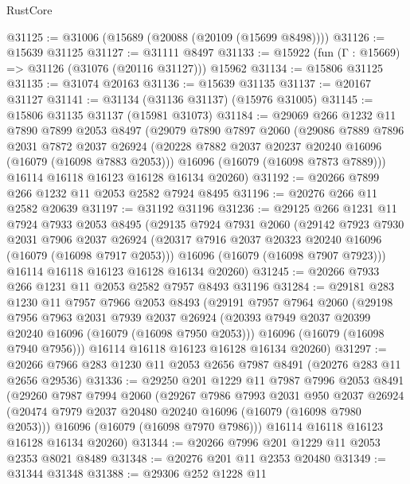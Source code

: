 \begin{lexlean}{RustCore}
\begin{coremodule}
@31125 := @31006 (@15689 (@20088 (@20109 (@15699 @8498))))
@31126 := @15639 @31125
@31127 := @31111 @8497
@31133 := @15922 (fun (Γ : @15669) => @31126 (@31076 (@20116 @31127))) @15962
@31134 := @15806 @31125
@31135 := @31074 @20163
@31136 := @15639 @31135
@31137 := @20167 @31127
@31141 := @31134 (@31136 @31137) (@15976 @31005)
@31145 := @15806 @31135 @31137 (@15981 @31073)
@31184 := @29069
    @266
    @1232
    @11
    @7890
    @7899
    @2053
    @8497
    (@29079
      @7890
      @7897
      @2060
      (@29086
        @7889
        @7896
        @2031
        @7872
        @2037
        @26924
        (@20228 @7882 @2037 @20237 @20240 @16096 (@16079 (@16098 @7883 @2053)))
        @16096
        (@16079 (@16098 @7873 @7889)))
      @16114
      @16118
      @16123
      @16128
      @16134
      @20260)
@31192 := @20266 @7899 @266 @1232 @11 @2053 @2582 @7924 @8495
@31196 := @20276 @266 @11 @2582 @20639
@31197 := @31192 @31196
@31236 := @29125
    @266
    @1231
    @11
    @7924
    @7933
    @2053
    @8495
    (@29135
      @7924
      @7931
      @2060
      (@29142
        @7923
        @7930
        @2031
        @7906
        @2037
        @26924
        (@20317 @7916 @2037 @20323 @20240 @16096 (@16079 (@16098 @7917 @2053)))
        @16096
        (@16079 (@16098 @7907 @7923)))
      @16114
      @16118
      @16123
      @16128
      @16134
      @20260)
@31245 := @20266 @7933 @266 @1231 @11 @2053 @2582 @7957 @8493 @31196
@31284 := @29181
    @283
    @1230
    @11
    @7957
    @7966
    @2053
    @8493
    (@29191
      @7957
      @7964
      @2060
      (@29198
        @7956
        @7963
        @2031
        @7939
        @2037
        @26924
        (@20393 @7949 @2037 @20399 @20240 @16096 (@16079 (@16098 @7950 @2053)))
        @16096
        (@16079 (@16098 @7940 @7956)))
      @16114
      @16118
      @16123
      @16128
      @16134
      @20260)
@31297 := @20266 @7966 @283 @1230 @11 @2053 @2656 @7987 @8491 (@20276 @283 @11 @2656 @29536)
@31336 := @29250
    @201
    @1229
    @11
    @7987
    @7996
    @2053
    @8491
    (@29260
      @7987
      @7994
      @2060
      (@29267
        @7986
        @7993
        @2031
        @950
        @2037
        @26924
        (@20474 @7979 @2037 @20480 @20240 @16096 (@16079 (@16098 @7980 @2053)))
        @16096
        (@16079 (@16098 @7970 @7986)))
      @16114
      @16118
      @16123
      @16128
      @16134
      @20260)
@31344 := @20266 @7996 @201 @1229 @11 @2053 @2353 @8021 @8489
@31348 := @20276 @201 @11 @2353 @20480
@31349 := @31344 @31348
@31388 := @29306
    @252
    @1228
    @11

\end{coremodule}
\end{lexlean}
